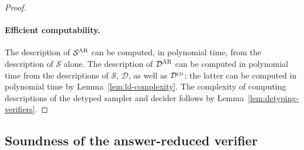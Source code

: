 \documentclass[11pt]{article}
\theoremstyle{definition}
\newcommand{\ld}{\textsc{ld}}
\DeclareMathOperator{\poly}{poly}
\newcommand{\sampler}{\mathcal{S}}
\newcommand{\decider}{\mathcal{D}}
\newcommand{\gamestyle}[1]{\ensuremath{\textsc{#1}}\xspace}
\newcommand{\ora}{\gamestyle{Orac}}
\newcommand{\pcp}{\gamestyle{PCP}}
\newcommand{\ar}{\gamestyle{AR}}
\newcommand{\machine}{\cal{M}}
\renewcommand{\cal}[1]{\mathcal{#1}}
\newcommand{\tmstyle}[1]{\ensuremath{\mathsf{#1}}}
\newcommand{\ComputeAnsVerifier}{\tmstyle{ComputeARVerifier}}
\newcommand{\qlen}{Q}
\begin{document}
\begin{proof}
  \paragraph{Efficient computability.}
  The description of $\sampler^\ar$ can be computed, in polynomial time, from
  the description of $\sampler$ alone.
  The description of $\decider^\ar$ can be computed in polynomial time from the
  descriptions of $\sampler$, $\decider$, as well as $\decider^\ld$; the latter
  can be computed in polynomial time by Lemma~\ref{lem:ld-complexity}.
  The complexity of computing descriptions of the detyped sampler and decider
  follows by Lemma~\ref{lem:detyping-verifiers}.\qedhere

\end{proof}

\subsection{Soundness of the answer-reduced verifier}
\label{sec:ar-soundness}
\end{document}
